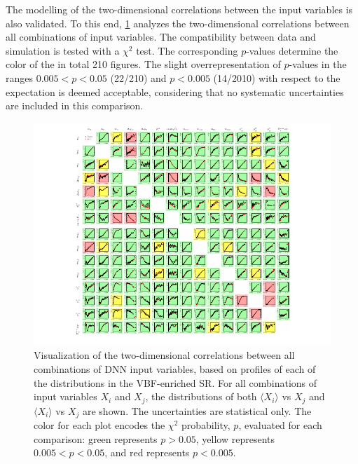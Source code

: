 The modelling of the two-dimensional correlations between the input variables is also validated.
To this end, \cref{fig:dnn-features-profiles} analyzes the two-dimensional correlations between all combinations of input variables. The compatibility between data and simulation is tested with a $\chi^2$ test.
The corresponding $p$-values determine the color of the in total 210 figures.
The slight overrepresentation of $p$-values in the ranges $0.005 < p < 0.05$ (22/210) and $p < 0.005$ (14/2010) with respect to the expectation is deemed acceptable, considering that no systematic uncertainties are included in this comparison.
\begin{figure}[ht]
    \includegraphics[width=\textwidth,trim=45 0 45 0]{figures/hww/dnn/correlations_PROF_SR.pdf}
    \caption{Visualization of the two-dimensional correlations between all combinations of DNN input variables, based on profiles of each of the distributions in the VBF-enriched \TwoJet SR. For all combinations of input variables $X_i$ and $X_j$, the distributions of both $\langle X_i \rangle$ vs $X_j$ and $\langle X_i \rangle$ vs $X_j$ are shown. The uncertainties are statistical only. The color for each plot encodes the $\chi^2$ probability, $p$, evaluated for each comparison: green represents $p > 0.05$, yellow represents $0.005 < p < 0.05$, and red represents $p < 0.005$.}
    \label{fig:dnn-features-profiles}
\end{figure}

